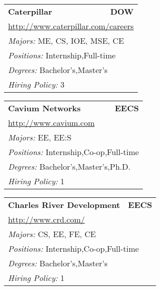 \documentclass[twoside]{article}
\begin{document}
\begin{center}
\begin{multicols}{3}
\begin{FlushLeft}
\begin{minipage}{.9\columnwidth}
\end{minipage}
 
\begin{minipage}{.9\columnwidth}\begin{tabularx}{.95\columnwidth}{Xr}
                 {\Large\bf Caterpillar} & {\Large\bf DOW}\\
    \multicolumn{2}{p{.95\columnwidth}}{\url{http://www.caterpillar.com/careers}}\\
    \multicolumn{2}{p{.95\columnwidth}}{\emph{Majors:} ME, CS, IOE, MSE, CE}\\
    \multicolumn{2}{p{.95\columnwidth}}{\emph{Positions:} Internship,Full-time}\\
    \multicolumn{2}{p{.95\columnwidth}}{\emph{Degrees:} Bachelor's,Master's}\\
    \multicolumn{2}{p{.95\columnwidth}}{\emph{Hiring Policy:} 3}\\
    \end{tabularx}
    
\end{minipage}
 
\begin{minipage}{.9\columnwidth}\begin{tabularx}{.95\columnwidth}{Xr}
                 {\Large\bf Cavium Networks} & {\Large\bf EECS}\\
    \multicolumn{2}{p{.95\columnwidth}}{\url{http://www.cavium.com}}\\
    \multicolumn{2}{p{.95\columnwidth}}{\emph{Majors:} EE, EE:S}\\
    \multicolumn{2}{p{.95\columnwidth}}{\emph{Positions:} Internship,Co-op,Full-time}\\
    \multicolumn{2}{p{.95\columnwidth}}{\emph{Degrees:} Bachelor's,Master's,Ph.D.}\\
    \multicolumn{2}{p{.95\columnwidth}}{\emph{Hiring Policy:} 1}\\
    \end{tabularx}
    
\end{minipage}
 
\begin{minipage}{.9\columnwidth}\begin{tabularx}{.95\columnwidth}{Xr}
                 {\Large\bf Charles River Development} & {\Large\bf EECS}\\
    \multicolumn{2}{p{.95\columnwidth}}{\url{http://www.crd.com/}}\\
    \multicolumn{2}{p{.95\columnwidth}}{\emph{Majors:} CS, EE, FE, CE}\\
    \multicolumn{2}{p{.95\columnwidth}}{\emph{Positions:} Internship,Co-op,Full-time}\\
    \multicolumn{2}{p{.95\columnwidth}}{\emph{Degrees:} Bachelor's,Master's}\\
    \multicolumn{2}{p{.95\columnwidth}}{\emph{Hiring Policy:} 1}\\
    \end{tabularx}
    

\end{minipage}
\end{FlushLeft}
\end{multicols}
\end{center}
\end{document}
